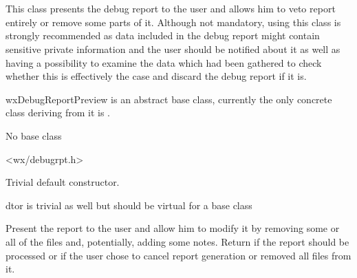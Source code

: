 
\section{}\label{wxdebugreportpreview}

This class presents the debug report to the user and allows him to veto report
entirely or remove some parts of it. Although not mandatory, using this class
is strongly recommended as data included in the debug report might contain
sensitive private information and the user should be notified about it as well
as having a possibility to examine the data which had been gathered to check
whether this is effectively the case and discard the debug report if it is.

wxDebugReportPreview is an abstract base class, currently the only concrete
class deriving from it is 
.


No base class


<wx/debugrpt.h>






\label{wxdebugreportpreviewwxdebugreportpreview}


Trivial default constructor.


\label{wxdebugreportpreviewdtor}


dtor is trivial as well but should be virtual for a base class


\label{wxdebugreportpreviewshow}


Present the report to the user and allow him to modify it by removing some or
all of the files and, potentially, adding some notes. Return \true if the
report should be processed or \false if the user chose to cancel report
generation or removed all files from it.


